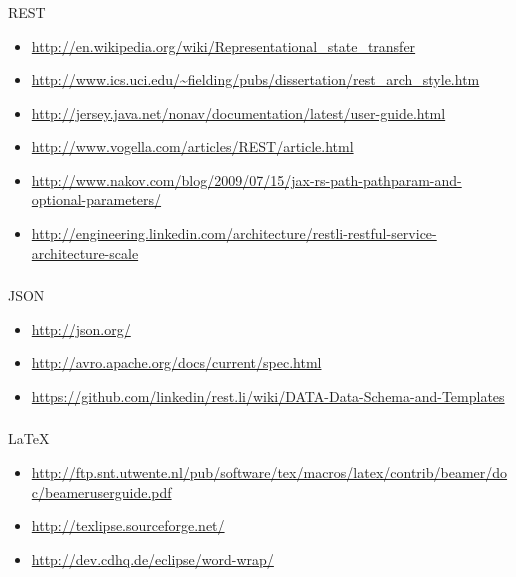 \documentclass[handout]{beamer}
\begin{document}
\begin{frame}
	\frametitle{\insertsection}
	REST\\
	\begin{itemize}
		\item \url{http://en.wikipedia.org/wiki/Representational_state_transfer}
		\item \url{http://www.ics.uci.edu/~fielding/pubs/dissertation/rest_arch_style.htm}
		\item \url{http://jersey.java.net/nonav/documentation/latest/user-guide.html}
		\item \url{http://www.vogella.com/articles/REST/article.html}
		\item \url{http://www.nakov.com/blog/2009/07/15/jax-rs-path-pathparam-and-optional-parameters/}
		\item \url{http://engineering.linkedin.com/architecture/restli-restful-service-architecture-scale}
	\end{itemize}
\end{frame}

\begin{frame}
	\frametitle{\insertsection}
	JSON\\
	\begin{itemize}
		\item \url{http://json.org/}
		\item \url{http://avro.apache.org/docs/current/spec.html}
		\item \url{https://github.com/linkedin/rest.li/wiki/DATA-Data-Schema-and-Templates}
	\end{itemize}
\end{frame}

\begin{frame}
	\frametitle{\insertsection}
	\LaTeX\\
	\begin{itemize}
		\item \url{http://ftp.snt.utwente.nl/pub/software/tex/macros/latex/contrib/beamer/doc/beameruserguide.pdf}
		\item \url{http://texlipse.sourceforge.net/}
		\item \url{http://dev.cdhq.de/eclipse/word-wrap/}
	\end{itemize}
\end{frame}
\end{document}
